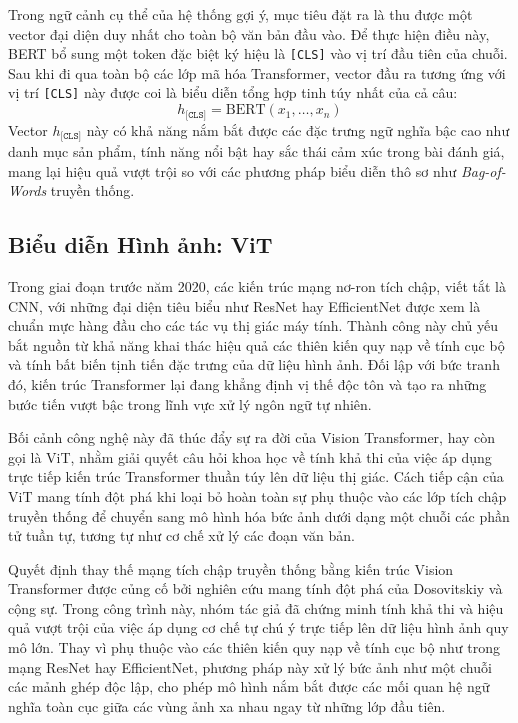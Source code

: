 Trong ngữ cảnh cụ thể của hệ thống gợi ý, mục tiêu đặt ra là thu được một vector đại diện duy nhất cho toàn bộ văn bản đầu vào. Để thực hiện điều này, BERT bổ sung một token đặc biệt ký hiệu là \texttt{[CLS]} vào vị trí đầu tiên của chuỗi. Sau khi đi qua toàn bộ các lớp mã hóa Transformer, vector đầu ra tương ứng với vị trí \texttt{[CLS]} này được coi là biểu diễn tổng hợp tinh túy nhất của cả câu:
\begin{equation}
    h_{\texttt{[CLS]}} = \text{BERT}(x_1, \dots, x_n)
\end{equation}
Vector $h_{\texttt{[CLS]}}$ này có khả năng nắm bắt được các đặc trưng ngữ nghĩa bậc cao như danh mục sản phẩm, tính năng nổi bật hay sắc thái cảm xúc trong bài đánh giá, mang lại hiệu quả vượt trội so với các phương pháp biểu diễn thô sơ như \textit{Bag-of-Words} truyền thống.

\subsection{Biểu diễn Hình ảnh: ViT}

Trong giai đoạn trước năm 2020, các kiến trúc mạng nơ-ron tích chập, viết tắt là CNN, với những đại diện tiêu biểu như ResNet hay EfficientNet được xem là chuẩn mực hàng đầu cho các tác vụ thị giác máy tính. Thành công này chủ yếu bắt nguồn từ khả năng khai thác hiệu quả các thiên kiến quy nạp về tính cục bộ và tính bất biến tịnh tiến đặc trưng của dữ liệu hình ảnh. Đối lập với bức tranh đó, kiến trúc Transformer\cite{12} lại đang khẳng định vị thế độc tôn và tạo ra những bước tiến vượt bậc trong lĩnh vực xử lý ngôn ngữ tự nhiên.

Bối cảnh công nghệ này đã thúc đẩy sự ra đời của Vision Transformer, hay còn gọi là ViT, nhằm giải quyết câu hỏi khoa học về tính khả thi của việc áp dụng trực tiếp kiến trúc Transformer thuần túy lên dữ liệu thị giác. Cách tiếp cận của ViT mang tính đột phá khi loại bỏ hoàn toàn sự phụ thuộc vào các lớp tích chập truyền thống để chuyển sang mô hình hóa bức ảnh dưới dạng một chuỗi các phần tử tuần tự, tương tự như cơ chế xử lý các đoạn văn bản.

Quyết định thay thế mạng tích chập truyền thống bằng kiến trúc Vision Transformer được củng cố bởi nghiên cứu mang tính đột phá của Dosovitskiy và cộng sự\cite{11}. Trong công trình này, nhóm tác giả đã chứng minh tính khả thi và hiệu quả vượt trội của việc áp dụng cơ chế tự chú ý trực tiếp lên dữ liệu hình ảnh quy mô lớn. Thay vì phụ thuộc vào các thiên kiến quy nạp về tính cục bộ như trong mạng ResNet hay EfficientNet, phương pháp này xử lý bức ảnh như một chuỗi các mảnh ghép độc lập, cho phép mô hình nắm bắt được các mối quan hệ ngữ nghĩa toàn cục giữa các vùng ảnh xa nhau ngay từ những lớp đầu tiên.

